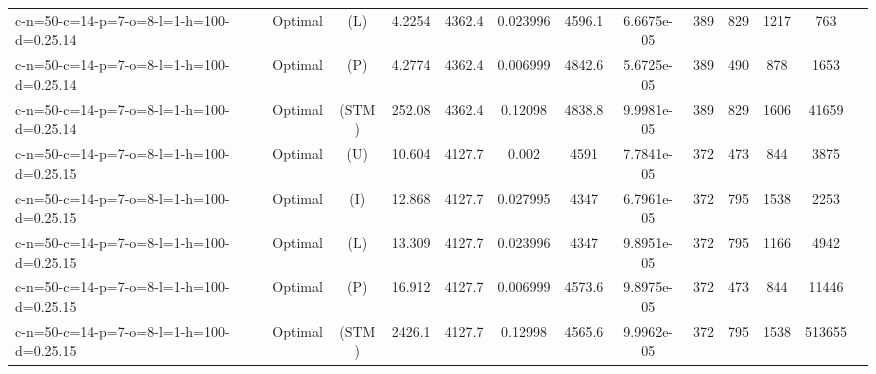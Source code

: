 \documentclass[landscape, a4paper]{article}
\newcommand{\STM}{\ensuremath{\mathrm{STM}}}
\newcommand{\Improved}{\ensuremath{\mathrm{I}}}
\newcommand{\Loose}{\ensuremath{\mathrm{L}}}
\newcommand{\Profit}{\ensuremath{\mathrm{P}}}
\newcommand{\Utility}{\ensuremath{\mathrm{U}}}
\begin{document}
\begin{center}
\begin{tabular}{lcccccccccccc}
c-n=50-c=14-p=7-o=8-l=1-h=100-d=0.25.14 & Optimal & (\Loose) & 4.2254 & 4362.4 & 0.023996 & 4596.1 & 6.6675e-05 & 389 & 829 & 1217 & 763 & \\
c-n=50-c=14-p=7-o=8-l=1-h=100-d=0.25.14 & Optimal & (\Profit) & 4.2774 & 4362.4 & 0.006999 & 4842.6 & 5.6725e-05 & 389 & 490 & 878 & 1653 & \\
c-n=50-c=14-p=7-o=8-l=1-h=100-d=0.25.14 & Optimal & (\STM) & 252.08 & 4362.4 & 0.12098 & 4838.8 & 9.9981e-05 & 389 & 829 & 1606 & 41659 & \\
c-n=50-c=14-p=7-o=8-l=1-h=100-d=0.25.15 & Optimal & (\Utility) & 10.604 & 4127.7 & 0.002 & 4591 & 7.7841e-05 & 372 & 473 & 844 & 3875 & \\
c-n=50-c=14-p=7-o=8-l=1-h=100-d=0.25.15 & Optimal & (\Improved) & 12.868 & 4127.7 & 0.027995 & 4347 & 6.7961e-05 & 372 & 795 & 1538 & 2253 & \\
c-n=50-c=14-p=7-o=8-l=1-h=100-d=0.25.15 & Optimal & (\Loose) & 13.309 & 4127.7 & 0.023996 & 4347 & 9.8951e-05 & 372 & 795 & 1166 & 4942 & \\
c-n=50-c=14-p=7-o=8-l=1-h=100-d=0.25.15 & Optimal & (\Profit) & 16.912 & 4127.7 & 0.006999 & 4573.6 & 9.8975e-05 & 372 & 473 & 844 & 11446 & \\
c-n=50-c=14-p=7-o=8-l=1-h=100-d=0.25.15 & Optimal & (\STM) & 2426.1 & 4127.7 & 0.12998 & 4565.6 & 9.9962e-05 & 372 & 795 & 1538 & 513655 & \\
\end{tabular}
\end{center}
\end{document}
